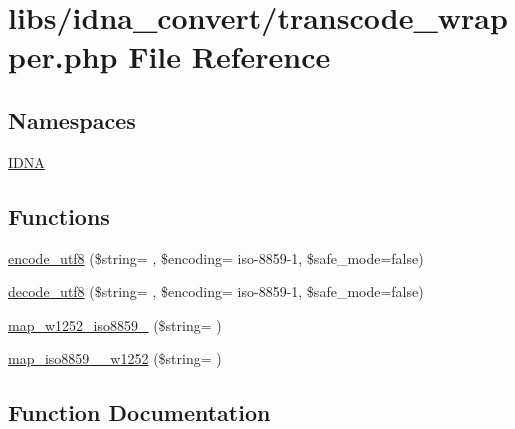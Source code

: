 \hypertarget{transcode__wrapper_8php}{}\section{libs/idna\+\_\+convert/transcode\+\_\+wrapper.php File Reference}
\label{transcode__wrapper_8php}
\subsection*{Namespaces}
\begin{DoxyCompactItemize}
\item 
 \hyperlink{namespaceIDNA}{I\+D\+N\+A}
\end{DoxyCompactItemize}
\subsection*{Functions}
\begin{DoxyCompactItemize}
\item 
\hyperlink{transcode__wrapper_8php_a2ff254e88e75a9b65a7f7ed6701d9307}{encode\+\_\+utf8} (\$string= \textquotesingle{}\textquotesingle{}, \$encoding= \textquotesingle{}iso-\/8859-\/1\textquotesingle{}, \$safe\+\_\+mode=false)
\item 
\hyperlink{transcode__wrapper_8php_ad2fd4d69808391b53e99415b7e7d593b}{decode\+\_\+utf8} (\$string= \textquotesingle{}\textquotesingle{}, \$encoding= \textquotesingle{}iso-\/8859-\/1\textquotesingle{}, \$safe\+\_\+mode=false)
\item 
\hyperlink{transcode__wrapper_8php_aa7960d121ac08a7136632119e2c7f9ff}{map\+\_\+w1252\+\_\+iso8859\+\_} (\$string= \textquotesingle{}\textquotesingle{})
\item 
\hyperlink{transcode__wrapper_8php_a4ef1158fdfc9dfbb47a3642cc16fe19b}{map\+\_\+iso8859\+\_\+\_\+w1252} (\$string= \textquotesingle{}\textquotesingle{})
\end{DoxyCompactItemize}


\subsection{Function Documentation}
\hypertarget{transcode__wrapper_8php_ad2fd4d69808391b53e99415b7e7d593b}{}
